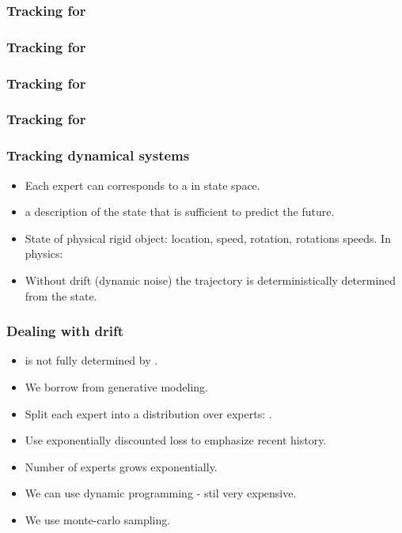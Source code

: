 \documentclass{beamer}
\begin{document}
\begin{frame}
\frametitle{Tracking for }
\end{frame}

\begin{frame}
\frametitle{Tracking for }
\end{frame}

\begin{frame}
\frametitle{Tracking for }
\end{frame}

\begin{frame}
\frametitle{Tracking for }
\end{frame}
\fi

\begin{frame}
\frametitle{Tracking dynamical systems}
\begin{itemize}
\item Each expert can corresponds to a  in state space.
\item {} a description of the state that is sufficient
  to predict the future.
\item State of physical rigid object: location, speed, rotation,
  rotations speeds. In physics: 
\item Without drift (dynamic noise) the trajectory is deterministically
  determined from the state.
\end{itemize}
\end{frame}

\begin{frame}
\frametitle{Dealing with drift}
\begin{itemize}
\item {} is not fully determined by .
\item We borrow from generative modeling.
\item Split each expert  into a distribution over experts:
.
\item Use exponentially discounted loss to emphasize recent history.
\item Number of experts grows exponentially.
\item We can use dynamic programming - stil very expensive.
\item We use monte-carlo sampling.
\end{itemize}
\end{frame}
\end{document}
